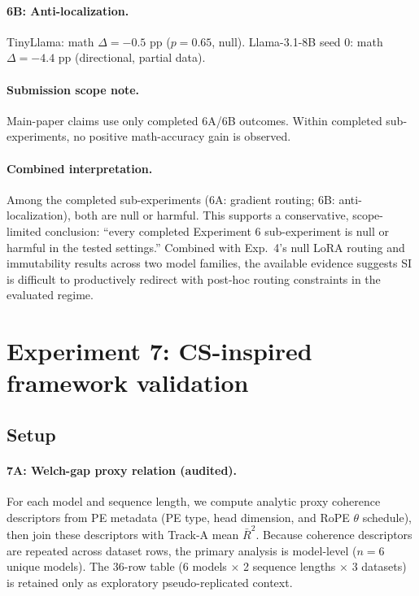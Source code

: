 \documentclass{article}
\begin{document}
\paragraph{6B: Anti-localization.} TinyLlama: math $\Delta = -0.5$ pp ($p = 0.65$, null).
Llama-3.1-8B seed 0: math $\Delta = -4.4$ pp (directional, partial data).

\paragraph{Submission scope note.}
Main-paper claims use only completed 6A/6B outcomes. Within completed sub-experiments, no
positive math-accuracy gain is observed.

\paragraph{Combined interpretation.} Among the completed sub-experiments
(6A: gradient routing; 6B: anti-localization), both are null or harmful.
This supports a conservative, scope-limited conclusion:
``every completed Experiment 6 sub-experiment is null or harmful in the tested settings.''
Combined with Exp.~4's null LoRA routing and immutability results across two model
families, the available evidence suggests SI is difficult to productively redirect
with post-hoc routing constraints in the evaluated regime.

\section{Experiment 7: CS-inspired framework validation}
\label{app:exp7}

\subsection{Setup}

\paragraph{7A: Welch-gap proxy relation (audited).} For each model and sequence length, we
compute analytic proxy coherence descriptors from PE metadata (PE type, head dimension, and
RoPE $\theta$ schedule), then join these descriptors with Track-A mean $\bar{R}^2$. Because
coherence descriptors are repeated across dataset rows, the primary analysis is model-level
($n=6$ unique models). The 36-row table (6 models $\times$ 2 sequence lengths $\times$ 3
datasets) is retained only as exploratory pseudo-replicated context.
\end{document}
